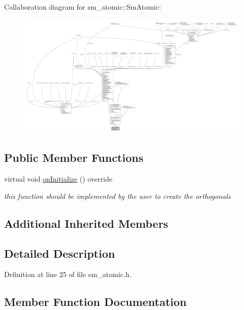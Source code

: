 Collaboration diagram for sm\+\_\+atomic\+:\+:Sm\+Atomic\+:
\nopagebreak
\begin{figure}[H]
\begin{center}
\leavevmode
\includegraphics[width=350pt]{structsm__atomic_1_1SmAtomic__coll__graph}
\end{center}
\end{figure}
\subsection*{Public Member Functions}
\begin{DoxyCompactItemize}
\item 
virtual void \hyperlink{structsm__atomic_1_1SmAtomic_ac87a3d5a78eb48b949b3948f9ce28d24}{on\+Initialize} () override
\begin{DoxyCompactList}\small\item\em this function should be implemented by the user to create the orthogonals \end{DoxyCompactList}\end{DoxyCompactItemize}
\subsection*{Additional Inherited Members}


\subsection{Detailed Description}


Definition at line 25 of file sm\+\_\+atomic.\+h.



\subsection{Member Function Documentation}
\mbox{\label{structsm__atomic_1_1SmAtomic_ac87a3d5a78eb48b949b3948f9ce28d24}} 
